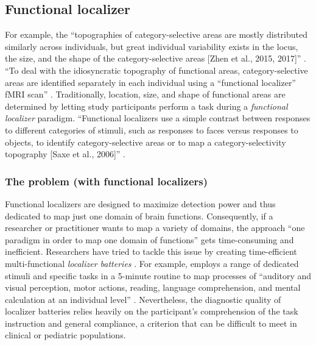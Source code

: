 \subsection{Functional localizer}
For example, the ``topographies of category-selective areas are mostly
distributed similarly across individuals, but great individual variability
exists in the locus, the size, and the shape of the category-selective areas
[Zhen et al., 2015, 2017]'' \citep{jiahui2020predicting}.
%
``To deal with the idiosyncratic topography of functional areas,
category-selective areas are identified separately in each individual using a
``functional localizer'' fMRI scan'' \citep{jiahui2020predicting}.
Traditionally, location, size, and shape of functional areas are determined by
letting study participants perform a task during a \textit{functional localizer}
paradigm.
%
``Functional localizers use a simple contrast between responses to different
categories of stimuli, such as responses to faces versus responses to objects,
to identify category-selective areas or to map a category-selectivity topography
[Saxe et al., 2006]'' \citep{jiahui2020predicting}.


\subsubsection{The problem (with functional localizers)}

Functional localizers are designed to maximize detection power and thus
dedicated to map just one domain of brain functions.
Consequently, if a researcher or practitioner wants to map a variety of domains,
the approach ``one paradigm in order to map one domain of functions'' gets
time-consuming and inefficient.
Researchers have tried to tackle this issue by creating time-efficient
multi-functional \textit{localizer batteries} \citep{barch2013function,
drobyshevsky2006rapid, pinel2007fast}.
For example, \citet{pinel2007fast} employs a range of dedicated stimuli and
specific tasks in a 5-minute routine to map processes of ``auditory and visual
perception, motor actions, reading, language comprehension, and mental
calculation at an individual level'' \citet{pinel2007fast}.
Nevertheless, the diagnostic quality of localizer batteries relies heavily on
the participant's comprehension of the task instruction and general compliance,
a criterion that can be difficult to meet in clinical or pediatric populations.


